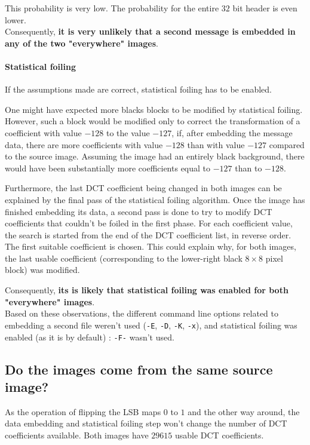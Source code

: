 \documentclass{article}
\begin{document}
This probability is very low. The probability for the entire $32$ bit header is even lower. \\

Consequently, \textbf{it is very unlikely that a second message is embedded in any of the two "everywhere" images}.

\paragraph{Statistical foiling} If the assumptions made are correct, statistical foiling has to be enabled.

One might have expected more blacks blocks to be modified by statistical foiling. However, such a block would be modified only to correct the transformation of a coefficient with value $-128$ to the value $-127$, if, after embedding the message data, there are more coefficients with value $-128$ than with value $-127$ compared to the source image. Assuming the image had an entirely black background, there would have been substantially more coefficients equal to $-127$ than to $-128$.

Furthermore, the last DCT coefficient being changed in both images can be explained by the final pass of the statistical foiling algorithm. Once the image has finished embedding its data, a second pass is done to try to modify DCT coefficients that couldn't be foiled in the first phase. For each coefficient value, the search is started from the end of the DCT coefficient list, in reverse order. The first suitable coefficient is chosen. This could explain why, for both images, the last usable coefficient (corresponding to the lower-right black $8 \times 8$ pixel block) was modified.

Consequently, \textbf{its is likely that statistical foiling was enabled for both "everywhere" images}. \\

Based on these observations, the different command line options related to embedding a second file weren't used (\texttt{-E}, \texttt{-D}, \texttt{-K}, \texttt{-x}), and statistical foiling was enabled (as it is by default) : \texttt{-F-} wasn't used.

\subsection{Do the images come from the same source image?}

As the operation of flipping the LSB maps $0$ to $1$ and the other way around, the data embedding and statistical foiling step won't change the number of DCT coefficients available. Both images have $29615$ usable DCT coefficients. 
\end{document}
